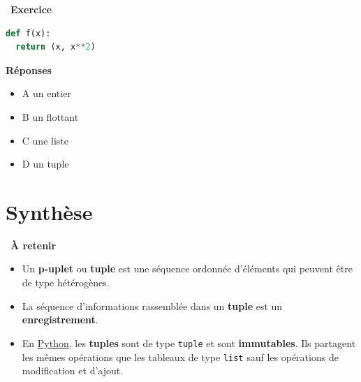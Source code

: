 \documentclass[
  11pt,
]{article}
\newcommand{\passthrough}[1]{#1}
\newcounter{exo}
\newenvironment{exercice}[1]
{\par \medskip   \addtocounter{exo}{1} \noindent  
\begin{bclogo}[arrondi =0.1,   noborder = true, logo=\bccrayon, marge=4]{~\textbf{Exercice} \textbf{\theexo} {\itshape #1} }  \par}
{
\end{bclogo}
 \par \bigskip }
\newcounter{def}
\newenvironment{memo}[1]
{\par \medskip    \noindent  
\begin{bclogo}[arrondi =0.1,  ombre = true, barre=none, logo=\bccle, marge=4]{~\textbf{À retenir}  {\itshape #1} }  \par}
{
\end{bclogo}
 \par \bigskip }
\begin{document}
\begin{exercice}{}
\begin{enumerate}
\begin{lstlisting}[language=Python]
def f(x):
  return (x, x**2)
\end{lstlisting}

  \textbf{Réponses}

  \begin{itemize}
  \item
    A un entier
  \item
    B un flottant
  \item
    C une liste
  \item
    D un tuple
  \end{itemize}
\end{enumerate}

\end{exercice}

\hypertarget{synthuxe8se}{%
\section{Synthèse}\label{synthuxe8se}}

\begin{memo}{}

\begin{itemize}
\item
  Un \textbf{p-uplet} ou \textbf{tuple} est une séquence ordonnée
  d'éléments qui peuvent être de type hétérogènes.
\item
  La séquence d'informations rassemblée dans un \textbf{tuple} est un
  \textbf{enregistrement}.
\item
  En
  \href{https://docs.python.org/3/tutorial/datastructures.html}{Python},
  les \textbf{tuples} sont de type \passthrough{\lstinline!tuple!} et
  sont \textbf{immutables}. Ils partagent les mêmes opérations que les
  tableaux de type \passthrough{\lstinline!list!} sauf les opérations de
  modification et d'ajout.
\end{itemize}

\end{memo}
\end{document}
